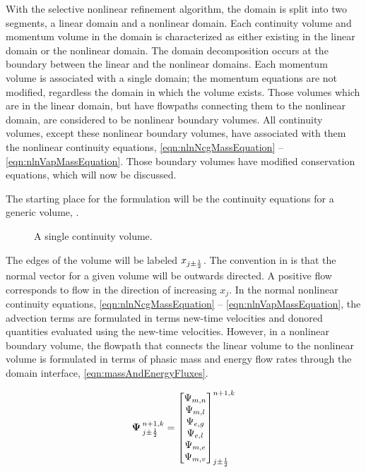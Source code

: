 With the selective nonlinear refinement algorithm, the domain is split into two segments, a linear domain and a nonlinear domain.
Each continuity volume and momentum volume in the domain is characterized as either existing in the linear domain or the nonlinear domain.
The domain decomposition occurs at the boundary between the linear and the nonlinear domains.
Each momentum volume is associated with a single domain; the momentum equations are not modified, regardless the domain in which the volume exists.
Those volumes which are in the linear domain, but have flowpaths connecting them to the nonlinear domain, are considered to be nonlinear boundary volumes.
All continuity volumes, except these nonlinear boundary volumes, have associated with them the nonlinear continuity equations, \eqref{eqn:nlnNcgMassEquation} -- \eqref{eqn:nlnVapMassEquation}.
Those boundary volumes have modified conservation equations, which will now be discussed.

The starting place for the formulation will be the continuity equations for a generic volume,  .

\begin{figure}[ht!]
\centering

\caption{A single continuity volume.}
\label{fig:single3dvol}
\end{figure}

The edges of the volume will be labeled $x_{j \pm \onehalf}$.
The convention in \cobra{} is that the normal vector for a given volume will be outwards directed.
A positive flow corresponds to flow in the direction of increasing $x_{j}$.
In the normal nonlinear continuity equations, \eqref{eqn:nlnNcgMassEquation} -- \eqref{eqn:nlnVapMassEquation}, the advection terms are formulated in terms new-time velocities and donored quantities evaluated using the new-time velocities.
However, in a nonlinear boundary volume, the flowpath that connects the linear volume to the nonlinear volume is formulated in terms of phasic mass and energy flow rates through the domain interface, \eqref{eqn:massAndEnergyFluxes}.

\begin{equation}
\label{eqn:massAndEnergyFluxes}
\vec{\Psi}^{n+1, k}_{j \pm \onehalf} = \begin{bmatrix}
\Psi_{m, n} \\
\Psi_{m, l} \\
\Psi_{e, g} \\
\Psi_{e, l} \\
\Psi_{m, e} \\
\Psi_{m, v} \\
\end{bmatrix}^{n+1, k}_{j \pm \onehalf}
\end{equation}

